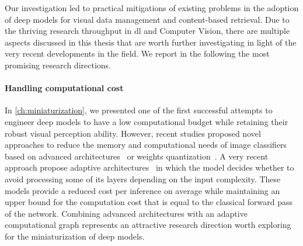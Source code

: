 Our investigation led to practical mitigations of existing problems in the adoption of deep models for visual data management and content-based retrieval.
Due to the thriving research throughput in \acrlong{dl} and Computer Vision, there are multiple aspects discussed in this thesis that are worth further investigating in light of the very recent developments in the field.
We report in the following the most promising research directions.

\paragraph{Handling computational cost}
In \ref{ch:miniaturization}, we presented one of the first successful attempts to engineer deep models to have a low computational budget while retaining their robust visual perception ability.
However, recent studies proposed novel approaches to reduce the memory and computational needs of image classifiers based on advanced architectures~\cite{iandola2016squeezenet,howard2017mobilenets} or weights quantization~\cite{rastegari2016xnor}.
A very recent approach propose adaptive architectures~\cite{veit2018convolutional} in which the model decides whether to avoid processing some of its layers depending on the input complexity.
These models provide a reduced cost per inference on average while maintaining an upper bound for the computation cost that is equal to the classical forward pass of the network.
Combining advanced architectures with an adaptive computational graph represents an attractive research direction worth exploring for the miniaturization of deep models.

